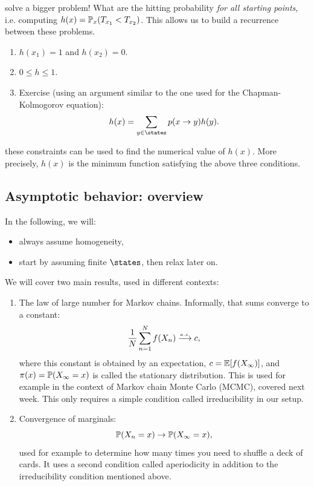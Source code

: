 \documentclass{article}
\begin{document}
 solve a bigger problem! What are the hitting probability \emph{for all starting points}, i.e. computing $h(x) = \P_x(T_{x_1} < T_{x_2})$. This allows us to build a recurrence between these problems.

\begin{enumerate}
  \item $h(x_1) = 1$ and $h(x_2) = 0$.
  \item $0 \le h \le 1$.
  \item Exercise (using an argument similar to the one used for the Chapman-Kolmogorov equation): \[ h(x) = \sum_{y\in\states} p(x\to y) h(y). \]
\end{enumerate}

 these constraints can be used to find the numerical value of $h(x)$. More precisely, $h(x)$ is the minimum function satisfying the above three conditions.


\subsection{Asymptotic behavior: overview}

 In the following, we will:
\begin{itemize}
  \item always assume homogeneity,
  \item start by assuming finite $\states$, then relax later on.
\end{itemize} 

We will cover two main results, used in different contexts:
\begin{enumerate}
  \item The law of large number for Markov chains. Informally, that sums converge to a constant: \[ \frac{1}{N} \sum_{n=1}^N f(X_n) \ascv c,\]where this constant is obtained by an expectation, $c = \E[f(X_\infty)]$, and $\pi(x) = \P(X_\infty = x)$ is called the stationary distribution. This is used for example in the context of Markov chain Monte Carlo (MCMC), covered next week. This only requires a simple condition called irreducibility in our setup.
  \item Convergence of marginals: \[ \P(X_n = x) \to \P(X_\infty = x), \]used for example to determine how many times you need to shuffle a deck of cards. It uses a second condition called aperiodicity in addition to the irreducibility condition mentioned above.
\end{enumerate}
\end{document}
